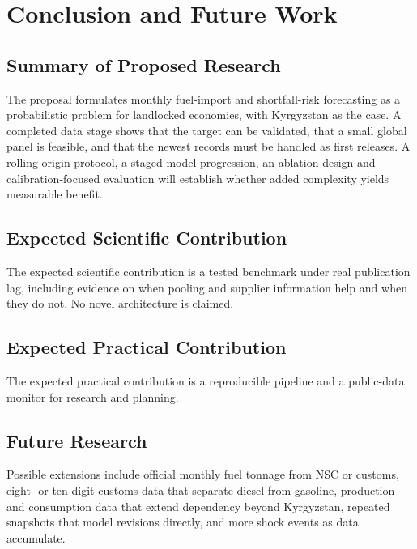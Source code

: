 \documentclass[conference]{IEEEtran}
\begin{document}
\section{Conclusion and Future Work}\label{sec:conclusion}

\subsection{Summary of Proposed Research}
The proposal formulates monthly fuel-import and shortfall-risk forecasting as a probabilistic problem for landlocked economies, with Kyrgyzstan as the case. A completed data stage shows that the target can be validated, that a small global panel is feasible, and that the newest records must be handled as first releases. A rolling-origin protocol, a staged model progression, an ablation design and calibration-focused evaluation will establish whether added complexity yields measurable benefit.

\subsection{Expected Scientific Contribution}
The expected scientific contribution is a tested benchmark under real publication lag, including evidence on when pooling and supplier information help and when they do not. No novel architecture is claimed.

\subsection{Expected Practical Contribution}
The expected practical contribution is a reproducible pipeline and a public-data monitor for research and planning.

\subsection{Future Research}
Possible extensions include official monthly fuel tonnage from NSC or customs, eight- or ten-digit customs data that separate diesel from gasoline, production and consumption data that extend dependency beyond Kyrgyzstan, repeated snapshots that model revisions directly, and more shock events as data accumulate.



\end{document}
